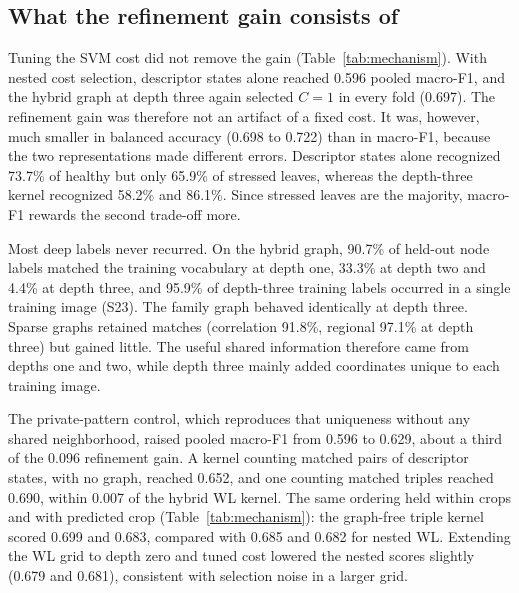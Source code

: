 \subsection{What the refinement gain consists of}
Tuning the SVM cost did not remove the gain (Table~\ref{tab:mechanism}). With nested cost selection, descriptor states alone reached 0.596 pooled macro-F1, and the hybrid graph at depth three again selected $C=1$ in every fold (0.697). The refinement gain was therefore not an artifact of a fixed cost. It was, however, much smaller in balanced accuracy (0.698 to 0.722) than in macro-F1, because the two representations made different errors. Descriptor states alone recognized 73.7\% of healthy but only 65.9\% of stressed leaves, whereas the depth-three kernel recognized 58.2\% and 86.1\%. Since stressed leaves are the majority, macro-F1 rewards the second trade-off more.

Most deep labels never recurred. On the hybrid graph, 90.7\% of held-out node labels matched the training vocabulary at depth one, 33.3\% at depth two and 4.4\% at depth three, and 95.9\% of depth-three training labels occurred in a single training image (S23). The family graph behaved identically at depth three. Sparse graphs retained matches (correlation 91.8\%, regional 97.1\% at depth three) but gained little. The useful shared information therefore came from depths one and two, while depth three mainly added coordinates unique to each training image.

The private-pattern control, which reproduces that uniqueness without any shared neighborhood, raised pooled macro-F1 from 0.596 to 0.629, about a third of the 0.096 refinement gain. A kernel counting matched pairs of descriptor states, with no graph, reached 0.652, and one counting matched triples reached 0.690, within 0.007 of the hybrid WL kernel. The same ordering held within crops and with predicted crop (Table~\ref{tab:mechanism}): the graph-free triple kernel scored 0.699 and 0.683, compared with 0.685 and 0.682 for nested WL. Extending the WL grid to depth zero and tuned cost lowered the nested scores slightly (0.679 and 0.681), consistent with selection noise in a larger grid.
\showpanel{\mechtable}


